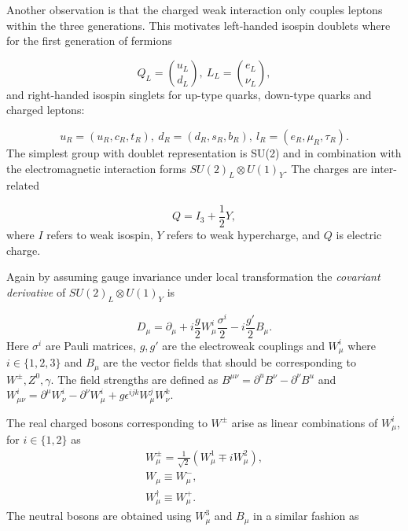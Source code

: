 Another observation is that the charged weak interaction only couples leptons within \DIFaddbegin {}\DIFaddend the three generations. This motivates left-handed isospin doublets where for the first generation of fermions

\begin{equation}
Q_{L} = \binom{u_{L}}{d_{L}}, ~L_{L} = \binom{e_{L}}{\nu_{L}},
	\label{eq:defdou}
\end{equation}
and right-handed isospin singlets for up-type quarks, down-type quarks and charged leptons:

\begin{equation}
	u_{R}=(u_{R},c_{R},t_{R}),~
	d_{R}=(d_{R},s_{R},b_{R}),~
	l_{R}=(e_{R},\mu_{R},\tau_{R}).
	\label{eq:defsin}
\end{equation}
The simplest group with doublet representation is SU(2) and in combination with the electromagnetic interaction forms $SU(2)_{L} \otimes U(1)_{Y}$. The \DIFdelbegin {}\DIFdelend \DIFaddbegin {}\DIFaddend charges are inter-related 

\begin{equation}
	Q=I_{3} + \frac{1}{2}Y,
\end{equation}
where $I$ refers to weak isospin, $Y$ refers to weak hypercharge, and $Q$ is electric charge.

Again by assuming gauge invariance under \DIFaddbegin {}\DIFaddend local transformation the \textit{covariant derivative} of $SU(2)_{L}\otimes U(1)_{Y}$ is 

\begin{equation}
	D_{\mu} = \partial_{\mu} + i\frac{g}{2}W_{\mu}^{i} \frac{\sigma^{i}}{2} - i \frac{g'}{2}B_{\mu}. 
\label{eq:covdev}
\end{equation}
Here $\sigma^{i}$ are \DIFaddbegin {}\DIFaddend Pauli matrices, $g,g'$ are the electroweak couplings and $W_{\mu}^{i}$ where $i\in\{1,2,3\}$ and $B_{\mu}$ are the vector fields that should be corresponding to $W^{\pm},Z^{0},\gamma$.
The field strengths are defined as $B^{\mu\nu}=\partial^{u}B^{\nu} - \partial^{\nu}B^{u}$ and $W^{i}_{\mu\nu} = \partial^{\mu}W^{i}_{\nu} - \partial^{\nu}W^{i}_{\mu}+ g\epsilon^{ijk}W_{\mu}^{j}W_{\nu}^{k}$.

The real charged bosons corresponding to \DIFaddbegin {}\DIFaddend $W^{\pm}$ arise as linear combinations of $W^{i}_{\mu}$, for $i\in\{1,2\}$ as
\begin{equation}
\begin{split}
W^{\pm}_{\mu} = \frac{1}{\sqrt{2}}(W^{1}_{\mu}\mp iW^{2}_{\mu}),
\\
W_{\mu} \equiv W^{-}_{\mu},
\\
W^{\dagger}_{\mu} \equiv W^{+}_{\mu}. 
\end{split}
\end{equation} 
The neutral bosons are obtained using $W_{\mu}^{3}$ and $B_{\mu}$ in a similar fashion as


